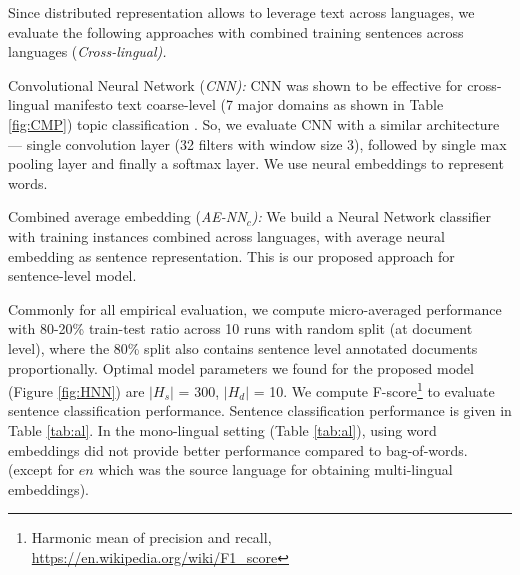 \documentclass[11pt,a4paper]{article}
\newcommand{\norm}[1]{\vert #1 \vert}
\begin{document}
Since distributed representation allows to leverage text across languages, we evaluate the following approaches with combined training sentences across languages (\em{Cross-lingual}). \rm

\begin{description}
\item{Convolutional Neural Network (\em{CNN}):} CNN was shown to be effective for cross-lingual manifesto text coarse-level (7 major domains as shown in Table \ref{fig:CMP}) topic classification \cite{W17-2906}. So, we evaluate CNN with a similar architecture --- single convolution layer (32 filters with window size 3), followed by single max pooling layer and finally a softmax layer. We use neural embeddings to represent words.
\item{Combined average embedding (\em{AE-NN$_{c}$}):} We build a Neural Network classifier with training instances combined across languages, with average neural embedding as sentence representation. This is our proposed approach for sentence-level model.
\end{description}

Commonly for all empirical evaluation, we compute micro-averaged performance with 80-20\% train-test ratio across 10 runs with random split (at document level), where the 80\% split also contains sentence level annotated documents proportionally. Optimal model parameters we found for the proposed model (Figure \ref{fig:HNN}) are $\norm{H_{s}}$ = 300, $\norm{H_{d}}$ = 10. We compute F-score\footnote{Harmonic mean of precision and recall, \url{https://en.wikipedia.org/wiki/F1_score}} to evaluate sentence classification performance. Sentence classification performance is given in Table \ref{tab:al}. In the mono-lingual setting (Table \ref{tab:al}), using word embeddings did not provide better performance compared to bag-of-words. (except for $en$ which was the source language for obtaining multi-lingual embeddings). 
\end{document}
